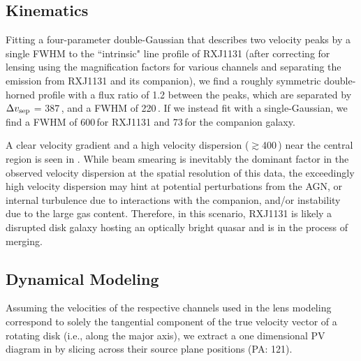 \documentclass[]{emulateapj}
\begin{document}
\subsection{\bco Kinematics}
Fitting a four-parameter double-Gaussian that describes two velocity peaks by a single FWHM
to the ``intrinsic" \bco line profile of RXJ1131 (after correcting for lensing using
the magnification factors for various channels and separating the emission from RXJ1131 and its companion),
we find a roughly symmetric double-horned profile with a flux ratio of 1.2 between the peaks, which
are separated by
$\Delta v_{\rm sep}$ = 387\,\kms, and a
FWHM of 220\,\kms.
If we instead fit with a single-Gaussian, we find a FWHM of 600\,\kms for RXJ1131
and 73\,\kms for the companion galaxy.

A clear velocity gradient and a high
velocity dispersion ($\gtrsim$400\,\kms) near the central region
is seen in . While beam smearing is inevitably the
dominant factor in the observed velocity dispersion
at the spatial resolution of this data, the exceedingly
high velocity dispersion may hint
at potential perturbations from the AGN, or internal turbulence due to
interactions with the companion, and/or instability due to the large gas
content.
Therefore, in this scenario, RXJ1131 is
likely a disrupted disk galaxy hosting an optically
bright quasar and is in the process of merging.

\subsection{\bco Dynamical Modeling} \label{sec:dynamics} %
Assuming the velocities of the respective channels used in the
lens modeling correspond to solely the tangential component of the
true velocity vector of a rotating disk (i.e., along the major axis),
we extract a one dimensional PV diagram in 
by slicing across their source plane positions (PA: 121\degr).
\end{document}
